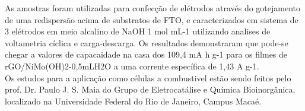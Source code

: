 \documentclass[12pt]{report}
\begin{document}
	As amostras foram utilizadas para confecção de elétrodos através do gotejamento de uma redispersão acima de substratos de FTO, e caracterizados em sistema de 3 elétrodos em meio alcalino de NaOH 1 mol mL-1 utilizando analises de voltametria cíclica e carga-descarga. Os resultados demonstraram que pode-se chegar a valores de capacaidade na casa dos 109,4 mA h g-1 para os filmes de rGO/NiMo(OH)2-0,5mLH2O a uma corrente específica de 1,43 A g-1.\\
	Os estudos para a aplicação como células a combustivel estão sendo feitos pelo prof. Dr. Paulo J. S. Maia do Grupo de Eletrocatálise e Química Bioinorgânica, localizado na Universidade Federal do Rio de Janeiro, Campus Macaé. \pagebreak
	
\end{document}
